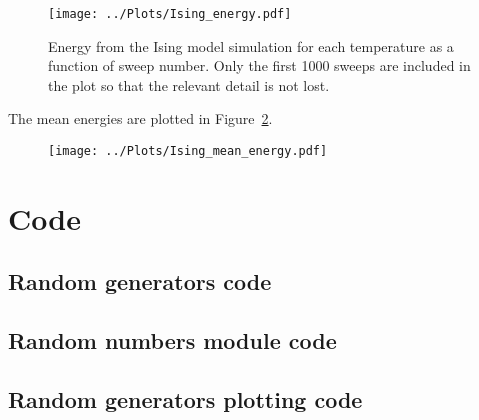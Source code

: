 \documentclass[twocolumn]{myarticle}
\begin{document}
\begin{figure}[ht!]
    \begin{center}
    \texttt{[image: ../Plots/Ising\_energy.pdf]}
    \caption{%
        Energy from the Ising model simulation for each temperature as a function of sweep number.
        Only the first 1000 sweeps are included in the plot so that the relevant detail is not lost.
    }
    \label{fig:ising_energy}
    \end{center}
\end{figure}

The mean energies are plotted in Figure~\ref{fig:ising_mean_energy}.

\begin{figure}[ht!]
    \begin{center}
    \texttt{[image: ../Plots/Ising\_mean\_energy.pdf]}
    \caption{%
    }
    \label{fig:ising_mean_energy}
    \end{center}
\end{figure}



\onecolumn

\section{Code}
\label{sec:code}

\subsection{Random generators code}
\label{subsec:random_generators_code}


\vspace{10pt}

\subsection{Random numbers module code}
\label{subsec:random_numbers_module_code}


\vspace{10pt}

\subsection{Random generators plotting code}
\label{subsec:random_generators_plotting_code}


\vspace{10pt}
\end{document}
